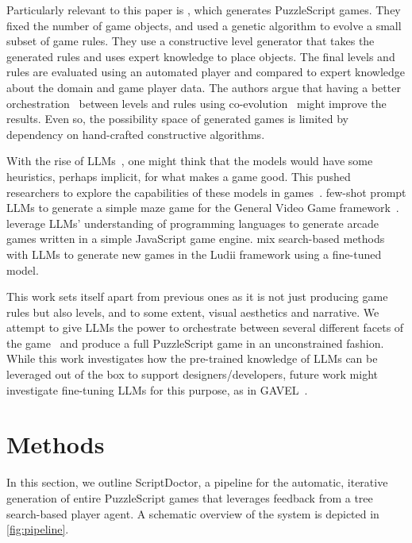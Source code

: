 \documentclass[conference]{IEEEtran}
\begin{document}
Particularly relevant to this paper is \cite{khalifa2015automatic}, which generates PuzzleScript games. They fixed the number of game objects, and used a genetic algorithm to evolve a small subset of game rules. They use a constructive level generator that takes the generated rules and uses expert knowledge to place objects. The final levels and rules are evaluated using an automated player and compared to expert knowledge about the domain and game player data. The authors argue that having a better orchestration~\cite{liapis2018orchestrating} between levels and rules using co-evolution~\cite{ma2018survey} might improve the results. Even so, the possibility space of generated games is limited by dependency on hand-crafted constructive algorithms.

With the rise of LLMs~\cite{zhao2023survey}, one might think that the models would have some heuristics, perhaps implicit, for what makes a game good. This pushed researchers to explore the capabilities of these models in games~\cite{gallotta2024large}. \cite{hu2024game} few-shot prompt LLMs to generate a simple maze game for the General Video Game framework~\cite{perez2019general}. \cite{abagames2024claude} leverage LLMs' understanding of programming languages to generate arcade games written in a simple JavaScript game engine. \cite{todd2024gavel} mix search-based methods~\cite{togelius2011search} with LLMs to generate new games in the Ludii framework using a fine-tuned model.

This work sets itself apart from previous ones as it is not just producing game rules but also levels, and to some extent, visual aesthetics and narrative. We attempt to give LLMs the power to orchestrate between several different facets of the game~\cite{liapis2018orchestrating} and produce a full PuzzleScript game in an unconstrained fashion. 
While this work investigates how the pre-trained knowledge of LLMs can be leveraged out of the box to support designers/developers, future work might investigate fine-tuning LLMs for this purpose, as in GAVEL~\cite{todd2024gavel}.

\section{Methods}
In this section, we outline ScriptDoctor, a pipeline for the automatic, iterative generation of entire PuzzleScript games that leverages feedback from a tree search-based player agent.
A schematic overview of the system is depicted in \ref{fig:pipeline}.
\end{document}
